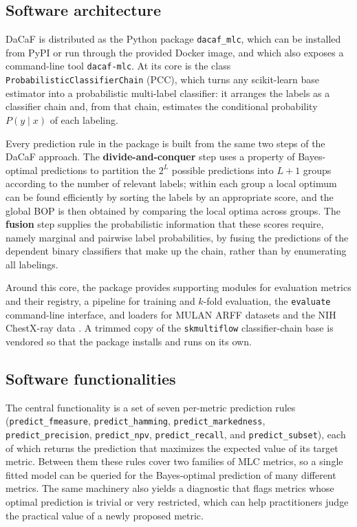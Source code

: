 \documentclass[11pt, letterpaper]{article}
\begin{document}
\subsection{Software architecture}
DaCaF is distributed as the Python package \texttt{dacaf\_mlc}, which can be installed
from PyPI or run through the provided Docker image, and which also exposes a command-line
tool \texttt{dacaf-mlc}. At its core is the class \texttt{ProbabilisticClassifierChain}
(PCC), which turns any scikit-learn base estimator into a probabilistic multi-label
classifier: it arranges the labels as a classifier chain \citep{cc2011} and, from that chain,
estimates the conditional probability $P(y\mid x)$ of each labeling.

Every prediction rule in the package is built from the same two steps of the DaCaF approach.
The \textbf{divide-and-conquer} step uses a property of Bayes-optimal predictions to
partition the $2^L$ possible predictions into $L{+}1$ groups according to the number of
relevant labels; within each group a local optimum can be found efficiently by sorting the
labels by an appropriate score, and the global BOP is then obtained by comparing the local
optima across groups. The \textbf{fusion} step supplies the probabilistic information that
these scores require, namely marginal and pairwise label probabilities, by fusing the predictions
of the dependent binary classifiers that make up the chain, rather than by enumerating all
labelings.

Around this core, the package provides supporting modules for evaluation metrics and their
registry, a pipeline for training and $k$-fold evaluation, the \texttt{evaluate} command-line
interface, and loaders for MULAN ARFF datasets \citep{mulan2011} and the NIH ChestX-ray data
\citep{chestxray2017}. A trimmed copy of
the \texttt{skmultiflow} classifier-chain base is vendored so that the package installs and
runs on its own.

\subsection{Software functionalities}
The central functionality is a set of seven per-metric prediction rules (\texttt{predict\_fmeasure},
\texttt{predict\_hamming}, \texttt{predict\_markedness}, \texttt{predict\_precision},
\texttt{predict\_npv}, \texttt{predict\_recall}, and \texttt{predict\_subset}), each of which
returns the prediction that maximizes the expected value of its target metric. Between them
these rules cover two families of MLC metrics, so a single fitted model can be queried for the
Bayes-optimal prediction of many different metrics. The same machinery also yields a diagnostic
that flags metrics whose optimal prediction is trivial or very restricted, which can help
practitioners judge the practical value of a newly proposed metric.
\end{document}

